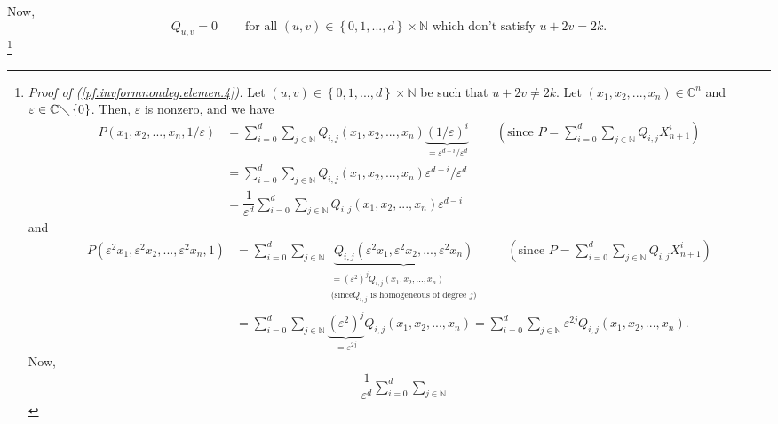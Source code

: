 \documentclass
[numbers=enddot,12pt,final,onecolumn,german,notitlepage]{scrartcl}%
\theoremstyle{definition}
\begin{document}
Now,%
\begin{equation}
Q_{u,v}=0\ \ \ \ \ \ \ \ \ \ \text{for all }\left(  u,v\right)  \in\left\{
0,1,...,d\right\}  \times\mathbb{N}\text{ which don't satisfy }%
u+2v=2k.\label{pf.invformnondeg.elemen.4}%
\end{equation}
\footnote{\textit{Proof of (\ref{pf.invformnondeg.elemen.4}).} Let $\left(
u,v\right)  \in\left\{  0,1,...,d\right\}  \times\mathbb{N}$ be such that
$u+2v\neq2k$. Let $\left(  x_{1},x_{2},...,x_{n}\right)  \in\mathbb{C}^{n}$
and $\varepsilon\in\mathbb{C}\diagdown\left\{  0\right\}  $. Then,
$\varepsilon$ is nonzero, and we have%
\begin{align*}
P\left(  x_{1},x_{2},...,x_{n},1/\varepsilon\right)   &  =\sum\limits_{i=0}%
^{d}\sum\limits_{j\in\mathbb{N}}Q_{i,j}\left(  x_{1},x_{2},...,x_{n}\right)
\underbrace{\left(  1/\varepsilon\right)  ^{i}}_{=\varepsilon^{d-i}%
/\varepsilon^{d}}\ \ \ \ \ \ \ \ \ \ \left(  \text{since }P=\sum
\limits_{i=0}^{d}\sum\limits_{j\in\mathbb{N}}Q_{i,j}X_{n+1}^{i}\right)  \\
&  =\sum\limits_{i=0}^{d}\sum\limits_{j\in\mathbb{N}}Q_{i,j}\left(
x_{1},x_{2},...,x_{n}\right)  \varepsilon^{d-i}/\varepsilon^{d}\\
&  =\dfrac{1}{\varepsilon^{d}}\sum\limits_{i=0}^{d}\sum\limits_{j\in
\mathbb{N}}Q_{i,j}\left(  x_{1},x_{2},...,x_{n}\right)  \varepsilon^{d-i}%
\end{align*}
and%
\begin{align*}
P\left(  \varepsilon^{2}x_{1},\varepsilon^{2}x_{2},...,\varepsilon^{2}%
x_{n},1\right)   &  =\sum\limits_{i=0}^{d}\sum\limits_{j\in\mathbb{N}%
}\underbrace{Q_{i,j}\left(  \varepsilon^{2}x_{1},\varepsilon^{2}%
x_{2},...,\varepsilon^{2}x_{n}\right)  }_{\substack{=\left(  \varepsilon
^{2}\right)  ^{j}Q_{i,j}\left(  x_{1},x_{2},...,x_{n}\right)  \\\text{(since
}Q_{i,j}\text{ is homogeneous of degree }j\text{)}}%
}\ \ \ \ \ \ \ \ \ \ \left(  \text{since }P=\sum\limits_{i=0}^{d}%
\sum\limits_{j\in\mathbb{N}}Q_{i,j}X_{n+1}^{i}\right)  \\
&  =\sum\limits_{i=0}^{d}\sum\limits_{j\in\mathbb{N}}\underbrace{\left(
\varepsilon^{2}\right)  ^{j}}_{=\varepsilon^{2j}}Q_{i,j}\left(  x_{1}%
,x_{2},...,x_{n}\right)  =\sum\limits_{i=0}^{d}\sum\limits_{j\in\mathbb{N}%
}\varepsilon^{2j}Q_{i,j}\left(  x_{1},x_{2},...,x_{n}\right)  .
\end{align*}
Now,%
\begin{align*}
&  \dfrac{1}{\varepsilon^{d}}\sum\limits_{i=0}^{d}\sum\limits_{j\in\mathbb{N}%
}
\end{align*}}
\end{document}
